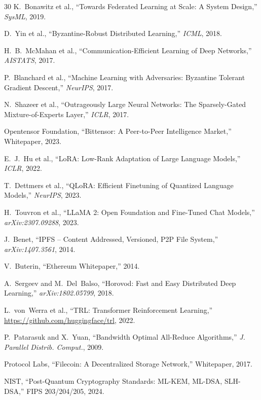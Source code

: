 \documentclass[11pt,letterpaper]{article}
\begin{document}
\begin{thebibliography}{30}
K.~Bonawitz et al., ``Towards Federated Learning at Scale: A System Design,'' \textit{SysML}, 2019.

D.~Yin et al., ``Byzantine-Robust Distributed Learning,'' \textit{ICML}, 2018.

H.~B.~McMahan et al., ``Communication-Efficient Learning of Deep Networks,'' \textit{AISTATS}, 2017.

P.~Blanchard et al., ``Machine Learning with Adversaries: Byzantine Tolerant Gradient Descent,'' \textit{NeurIPS}, 2017.

N.~Shazeer et al., ``Outrageously Large Neural Networks: The Sparsely-Gated Mixture-of-Experts Layer,'' \textit{ICLR}, 2017.

Opentensor Foundation, ``Bittensor: A Peer-to-Peer Intelligence Market,'' Whitepaper, 2023.

E.~J.~Hu et al., ``LoRA: Low-Rank Adaptation of Large Language Models,'' \textit{ICLR}, 2022.

T.~Dettmers et al., ``QLoRA: Efficient Finetuning of Quantized Language Models,'' \textit{NeurIPS}, 2023.

H.~Touvron et al., ``LLaMA 2: Open Foundation and Fine-Tuned Chat Models,'' \textit{arXiv:2307.09288}, 2023.

J.~Benet, ``IPFS -- Content Addressed, Versioned, P2P File System,'' \textit{arXiv:1407.3561}, 2014.

V.~Buterin, ``Ethereum Whitepaper,'' 2014.

A.~Sergeev and M.~Del~Balso, ``Horovod: Fast and Easy Distributed Deep Learning,'' \textit{arXiv:1802.05799}, 2018.

L.~von~Werra et al., ``TRL: Transformer Reinforcement Learning,'' \url{https://github.com/huggingface/trl}, 2022.

P.~Patarasuk and X.~Yuan, ``Bandwidth Optimal All-Reduce Algorithms,'' \textit{J. Parallel Distrib. Comput.}, 2009.

Protocol Labs, ``Filecoin: A Decentralized Storage Network,'' Whitepaper, 2017.

NIST, ``Post-Quantum Cryptography Standards: ML-KEM, ML-DSA, SLH-DSA,'' FIPS 203/204/205, 2024.

\end{thebibliography}
\end{document}
